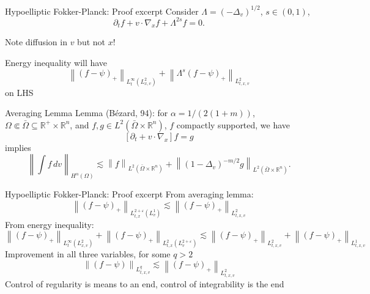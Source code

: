 \documentclass{beamer}
\newcommand{\R}{\mathbb{R}}
\newcommand{\eps}{\varepsilon}
\newcommand{\norm}[1]{\left\lVert#1\right\rVert}
\newcommand{\bracket}[1]{\left[ #1 \right]}
\newcommand{\abs}[1]{\left\lvert #1 \right\rvert}
\newcommand{\del}{\partial}
\newcommand{\grad}{\nabla}
\newcommand{\Laplace}{\Delta}
\begin{document}
\begin{frame}{Hypoelliptic Fokker-Planck: Proof excerpt}
\pause
Consider $\Lambda = (-\Laplace_v)^{1/2}$, $s \in (0,1)$,
\[ \del_t f + v\cdot\grad_x f + \Lambda^{2s} f = 0. \]

Note diffusion in $v$ but not $x$!

Energy inequality will have
\[ \norm{(f-\psi)_+}_{L^\infty_t(L^2_{x,v})} + \norm{\Lambda^s (f-\psi)_+}_{L^2_{t,x,v}} \]
on LHS
\end{frame}


\begin{frame}{Averaging Lemma}
Lemma (B\'{e}zard, 94): for $\alpha = 1/(2(1+m))$, $\Omega \Subset \bar{\Omega} \subseteq \R^+ \times \R^n$, and $f,g \in L^2(\bar{\Omega} \times \R^n)$, $f$ compactly supported, we have
\[ \bracket{\del_t + v\cdot\grad_x} f = g \]
implies
\[ \norm{\int f \,dv}_{H^\alpha(\Omega)} \lesssim \norm{f}_{L^2(\bar{\Omega} \times \R^n)} + \norm{(1-\Laplace_v)^{-m/2} g }_{L^2(\bar{\Omega} \times \R^n)}. \]
\end{frame}




\begin{frame}{Hypoelliptic Fokker-Planck: Proof excerpt}
From averaging lemma:
\[ \norm{(f-\psi)_+}_{L^{2+\eps}_{t,x}(L^1_v)} \lesssim \norm{(f-\psi)_+}_{L^2_{t,x,v}} \]
\pause
From energy inequality:
\[ \norm{(f-\psi)_+}_{L^\infty_t(L^2_{x,v})} + \norm{(f-\psi)_+}_{L^2_{t,x}(L^{2+\eps}_v)} \lesssim \norm{(f-\psi)_+}_{L^2_{t,x,v}} + \norm{(f-\psi)_+}_{L^1_{t,x,v}} \]
\pause
Improvement in all three variables, for some $q > 2$
\[ \norm{(f-\psi)}_{L^q_{t,x,v}} \lesssim \norm{(f-\psi)_+}_{L^2_{t,x,v}} \]
\pause
Control of regularity is means to an end, control of integrability is the end
\end{frame}
\end{document}
